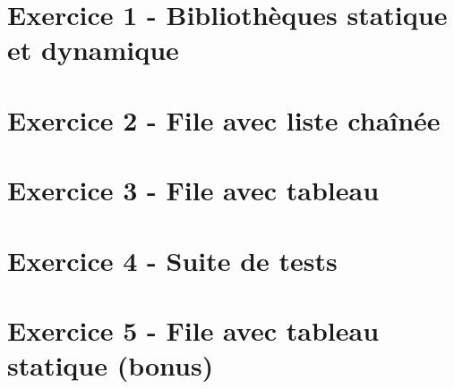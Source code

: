 \documentclass[12pt,a4paper]{article}
\begin{document}
\section{Exercice 1 - Bibliothèques statique et dynamique}

\vspace*{0.7cm}



\newpage

\section{Exercice 2 - File avec liste chaînée}

\vspace*{0.7cm}



\newpage

\section{Exercice 3 - File avec tableau}

\vspace*{0.7cm}



\newpage

\section{Exercice 4 - Suite de tests}

\vspace*{0.7cm}



\newpage

\section{Exercice 5 - File avec tableau statique (bonus)}

\vspace*{0.7cm}


\end{document}
